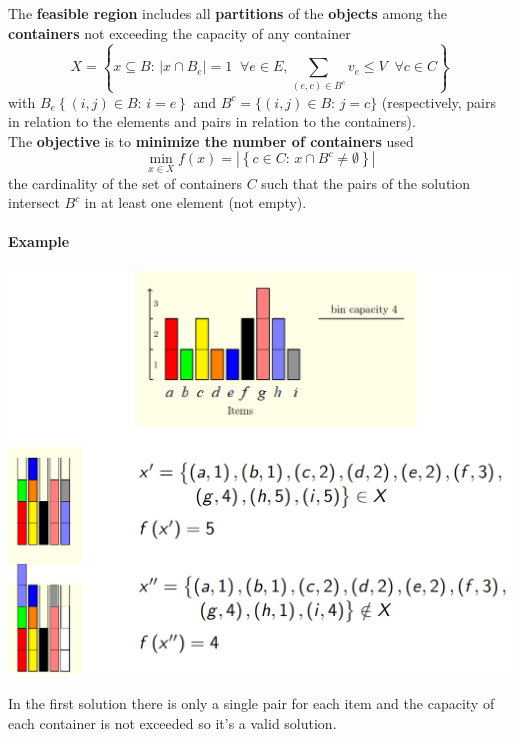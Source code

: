 The \textbf{feasible region} includes all \textbf{partitions} of the \textbf{objects} among the \textbf{containers} not exceeding the capacity of any container
$$ X = \left\{ x \subseteq B : \, |x \cap B_e| = 1 \;\; \forall e \in E, \sum_{(e,c) \in B^c} v_e \leq V \;\; \forall c \in C \right\}$$
with $B_e \left\{(i,j) \in B : \, i = e\right\}$ and $B^c = \{(i,j) \in B : \, j = c \}$ (respectively, pairs in relation to the elements and pairs in relation to the containers).\\

The \textbf{objective} is to \textbf{minimize the number of containers} used
$$ \min_{x \in X} f(x) = \left| \left\{c \in C : \, x \cap B^c \neq \emptyset \right\}\right| $$
the cardinality of the set of containers $C$ such that the pairs of the solution intersect $B^c$ in at least one element (not empty).\\

\newpage

\paragraph{Example}
\begin{center}
	\includegraphics[width=\columnwidth]{img/BPP1}
\end{center}
In the first solution there is only a single pair for each item and the capacity of each container is not exceeded so it's a valid solution.

\newpage

